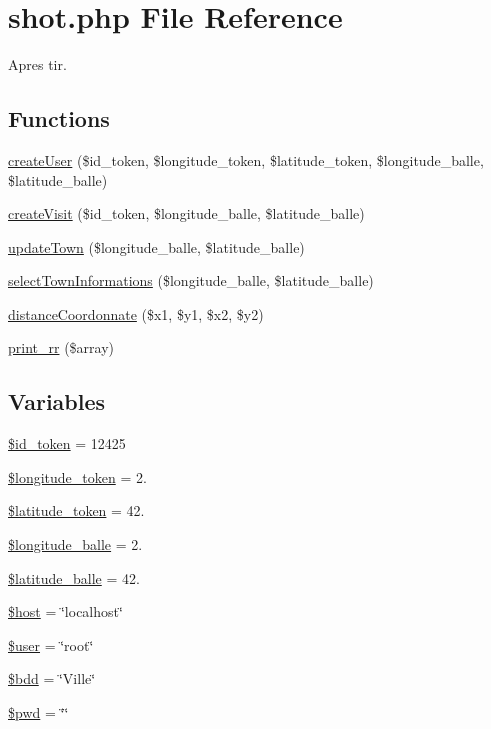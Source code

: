 \hypertarget{shot_8php}{\section{shot.\-php File Reference}
\label{shot_8php}
}


Apres tir.  


\subsection*{Functions}
\begin{DoxyCompactItemize}
\item 
\hyperlink{shot_8php_ab6a8967472d5df6df9da11b9256b75ec}{create\-User} (\$id\-\_\-token, \$longitude\-\_\-token, \$latitude\-\_\-token, \$longitude\-\_\-balle, \$latitude\-\_\-balle)
\item 
\hyperlink{shot_8php_af402136fe075023c12cf5bf84c9c411f}{create\-Visit} (\$id\-\_\-token, \$longitude\-\_\-balle, \$latitude\-\_\-balle)
\item 
\hyperlink{shot_8php_a0ff912f51ca8470163bac790870a5a27}{update\-Town} (\$longitude\-\_\-balle, \$latitude\-\_\-balle)
\item 
\hyperlink{shot_8php_a5441be587253f739940e88c0762d9caa}{select\-Town\-Informations} (\$longitude\-\_\-balle, \$latitude\-\_\-balle)
\item 
\hyperlink{shot_8php_a74fbf5e6ad51d8a426e652005f3e3c8a}{distance\-Coordonnate} (\$x1, \$y1, \$x2, \$y2)
\item 
\hyperlink{shot_8php_a9bd2343fa51e8583eae478b815fba8c2}{print\-\_\-rr} (\$array)
\end{DoxyCompactItemize}
\subsection*{Variables}
\begin{DoxyCompactItemize}
\item 
\hyperlink{shot_8php_ab5264b0b6861610a94924860afdac652}{\$id\-\_\-token} = 12425
\item 
\hyperlink{shot_8php_a09b4f52a28fc5cead1e6b37f47ed24db}{\$longitude\-\_\-token} = 2.
\item 
\hyperlink{shot_8php_a818aa9f4782177a9012af48c0f692900}{\$latitude\-\_\-token} = 42.
\item 
\hyperlink{shot_8php_a480a12fab05c6e776b272613688d6988}{\$longitude\-\_\-balle} = 2.
\item 
\hyperlink{shot_8php_a8782786cb084d7e43ef5696866e3398d}{\$latitude\-\_\-balle} = 42.
\item 
\hyperlink{shot_8php_a711797613cb863ca0756df789c396bf2}{\$host} = \char`\"{}localhost\char`\"{}
\item 
\hyperlink{shot_8php_a598ca4e71b15a1313ec95f0df1027ca5}{\$user} = \char`\"{}root\char`\"{}
\item 
\hyperlink{shot_8php_a94f91e878bce0991e2cd595c5dd79b3f}{\$bdd} = \char`\"{}Ville\char`\"{}
\item 
\hyperlink{shot_8php_a12e4252e778952d356721bc655cff8c8}{\$pwd} = \char`\"{}\char`\"{}
\end{DoxyCompactItemize}


